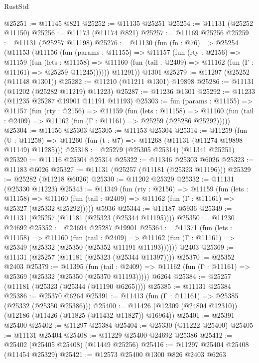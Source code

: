 \begin{lexlean}{RustStd}
\begin{coremodule}
@25251 := @11145 @821
@25252 := @11135 @25251
@25254 := @11131 (@25252 @11150)
@25256 := @11173 (@11174 @821)
@25257 := @11169 @25256
@25259 := @11131 (@25257 @11198)
@25276 := @11130
    (fun (fn : @76) =>
    @25254
      (@11153
        (@11156
          (fun (params : @11155) =>
          @11157
            (fun (rty : @2156) =>
            @11159
              (fun (lets : @11158) =>
              @11160 (fun (tail : @2409) => @11162 (fun (Γ : @11161) => @25259 @11245))))))
        @11291))
    @1301
@25279 := @11297 (@25252 (@11148 @1301))
@25282 := @11210 (@11211 @1301) @19898
@25286 := @11131 (@11202 (@25282 @11219) @11223)
@25287 := @11236 @1301
@25292 := @11233 (@11235 @25287 @19901 @11191 @11193)
@25303 := fun (params : @11155) =>
  @11157
    (fun (rty : @2156) =>
    @11159
      (fun (lets : @11158) =>
      @11160 (fun (tail : @2409) => @11162 (fun (Γ : @11161) => @25259 (@25286 @25292)))))
@25304 := @11156 @25303
@25305 := @11153 @25304
@25314 := @11259
    (fun (U : @11258) => @11260 (fun (t : @7) => @11268 (@11131 (@11274 @19898 @11149) @11285)))
@25318 := @25279 (@25305 @25314) (@11341 @25251)
@25320 := @11116 @25304 @25314
@25322 := @11346 @25303 @6026
@25323 := @11183 @6026
@25327 := @11131 (@25257 (@11181 (@25323 @11196)))
@25329 := @25282 (@11218 @6026)
@25330 := @11202 @25329
@25332 := @11131 (@25330 @11223)
@25343 := @11349
    (fun (rty : @2156) =>
    @11159
      (fun (lets : @11158) =>
      @11160 (fun (tail : @2409) => @11162 (fun (Γ : @11161) => @25327 (@25332 @25292)))))
    @5936
@25344 := @11187 @5936
@25349 := @11131 (@25257 (@11181 (@25323 (@25344 @11195))))
@25350 := @11230 @24692
@25352 := @24694 @25287 @19901
@25364 := @11371
    (fun (lets : @11158) =>
    @11160
      (fun (tail : @2409) =>
      @11162 (fun (Γ : @11161) => @25349 (@25332 (@25350 (@25352 @11191 @11193))))))
    @2403
@25369 := @11131 (@25257 (@11181 (@25323 (@25344 @11397))))
@25370 := @25352 @2403
@25379 := @11395
    (fun (tail : @2409) => @11162 (fun (Γ : @11161) => @25369 (@25332 (@25350 (@25370 @11193)))))
    @6264
@25384 := @25257 (@11181 (@25323 (@25344 (@11190 @6265))))
@25385 := @11131 @25384
@25386 := @25370 @6264
@25391 := @11413 (fun (Γ : @11161) => @25385 (@25332 (@25350 @25386)))
@25400 := @11426 (@12309 (@24804 @12310)) (@12186 (@11426 (@11825 (@11432 @11827)) @16964))
@25401 := @25391 @25400
@25402 := @11297 @25384
@25404 := @25330 (@11222 @25400)
@25405 := @11131 @25404
@25408 := @11229 @25400 @24692 @25386
@25412 := @25402 (@25405 @25408) (@11449 @25256)
@25416 := @11297 @25404 @25408 (@11454 @25329)
@25421 := @12573 @25400 @1300 @826 @2403 @6263

\end{coremodule}
\end{lexlean}
